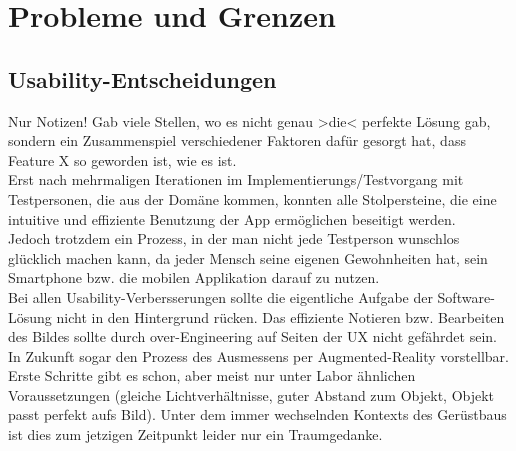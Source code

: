 \chapter{Probleme und Grenzen}
\section{Usability-Entscheidungen}
\large{Nur Notizen!}
Gab viele Stellen, wo es nicht genau >die< perfekte Lösung gab, sondern ein 
Zusammenspiel verschiedener Faktoren dafür gesorgt hat, dass Feature X so geworden
ist, wie es ist. \\

Erst nach mehrmaligen Iterationen im Implementierungs/Testvorgang mit Testpersonen, 
die aus der Domäne kommen, konnten alle Stolpersteine, die eine intuitive und 
effiziente Benutzung der App ermöglichen beseitigt werden. \\

Jedoch trotzdem ein Prozess, in der man nicht jede Testperson wunschlos glücklich machen kann,
da jeder Mensch seine eigenen Gewohnheiten hat, sein Smartphone bzw. die mobilen Applikation darauf
zu nutzen. \\

Bei allen Usability-Verbersserungen sollte die eigentliche Aufgabe der Software-Lösung nicht in den
Hintergrund rücken. Das effiziente Notieren bzw. Bearbeiten des Bildes sollte durch
over-Engineering auf Seiten der UX nicht gefährdet sein. \\

In Zukunft sogar den Prozess des Ausmessens per Augmented-Reality vorstellbar. Erste Schritte
gibt es schon, aber meist nur unter Labor ähnlichen Voraussetzungen (gleiche Lichtverhältnisse, 
guter Abstand zum Objekt, Objekt passt perfekt aufs Bild). Unter dem immer wechselnden Kontexts
des Gerüstbaus ist dies zum jetzigen Zeitpunkt leider nur ein Traumgedanke. \\


